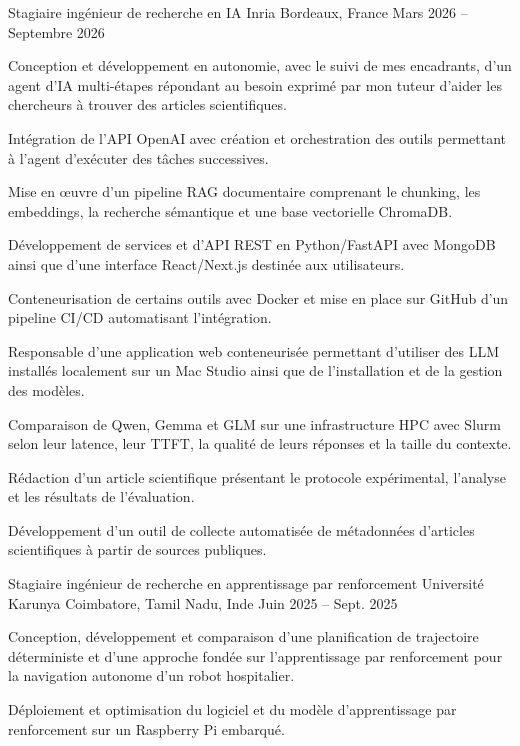 
\begin{cventries}
  \cventry
    {Stagiaire ingénieur de recherche en IA}
    {Inria}
    {Bordeaux, France}
    {Mars 2026 -- Septembre 2026}
    {
      \begin{cvitems}
        \item {Conception et développement en autonomie, avec le suivi de mes encadrants, d’un agent d’IA multi-étapes répondant au besoin exprimé par mon tuteur d’aider les chercheurs à trouver des articles scientifiques.}
        \item {Intégration de l’API OpenAI avec création et orchestration des outils permettant à l’agent d’exécuter des tâches successives.}
        \item {Mise en œuvre d’un pipeline RAG documentaire comprenant le chunking, les embeddings, la recherche sémantique et une base vectorielle ChromaDB.}
        \item {Développement de services et d’API REST en Python/FastAPI avec MongoDB ainsi que d’une interface React/Next.js destinée aux utilisateurs.}
        \item {Conteneurisation de certains outils avec Docker et mise en place sur GitHub d’un pipeline CI/CD automatisant l’intégration.}
        \item {Responsable d’une application web conteneurisée permettant d’utiliser des LLM installés localement sur un Mac Studio ainsi que de l’installation et de la gestion des modèles.}
        \item {Comparaison de Qwen, Gemma et GLM sur une infrastructure HPC avec Slurm selon leur latence, leur TTFT, la qualité de leurs réponses et la taille du contexte.}
        \item {Rédaction d’un article scientifique présentant le protocole expérimental, l’analyse et les résultats de l’évaluation.}
        \item {Développement d’un outil de collecte automatisée de métadonnées d’articles scientifiques à partir de sources publiques.}
      \end{cvitems}
    }

  \cventry
    {Stagiaire ingénieur de recherche en apprentissage par renforcement}
    {Université Karunya}
    {Coimbatore, Tamil Nadu, Inde}
    {Juin 2025 -- Sept. 2025}
    {
      \begin{cvitems}
        \item {Conception, développement et comparaison d’une planification de trajectoire déterministe et d’une approche fondée sur l’apprentissage par renforcement pour la navigation autonome d’un robot hospitalier.}
        \item {Déploiement et optimisation du logiciel et du modèle d’apprentissage par renforcement sur un Raspberry Pi embarqué.}
      \end{cvitems}
    }
\end{cventries}
